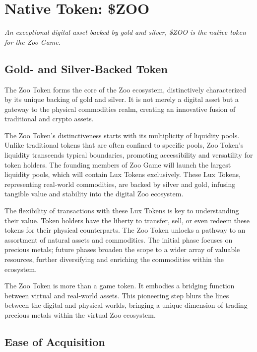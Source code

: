 \section{Native Token: \$ZOO}
\label{sec:native-token}

\textit{An exceptional digital asset backed by gold and silver, \$ZOO is the native token for the Zoo Game.}

\subsection{Gold- and Silver-Backed Token}

The Zoo Token forms the core of the Zoo ecosystem, distinctively characterized by its unique backing of gold and silver. It is not merely a digital asset but a gateway to the physical commodities realm, creating an innovative fusion of traditional and crypto assets.

The Zoo Token's distinctiveness starts with its multiplicity of liquidity pools. Unlike traditional tokens that are often confined to specific pools, Zoo Token's liquidity transcends typical boundaries, promoting accessibility and versatility for token holders. The founding members of Zoo Game will launch the largest liquidity pools, which will contain Lux Tokens exclusively. These Lux Tokens, representing real-world commodities, are backed by silver and gold, infusing tangible value and stability into the digital Zoo ecosystem.

The flexibility of transactions with these Lux Tokens is key to understanding their value. Token holders have the liberty to transfer, sell, or even redeem these tokens for their physical counterparts. The Zoo Token unlocks a pathway to an assortment of natural assets and commodities. The initial phase focuses on precious metals; future phases broaden the scope to a wider array of valuable resources, further diversifying and enriching the commodities within the ecosystem.

The Zoo Token is more than a game token. It embodies a bridging function between virtual and real-world assets. This pioneering step blurs the lines between the digital and physical worlds, bringing a unique dimension of trading precious metals within the virtual Zoo ecosystem.

\subsection{Ease of Acquisition}

